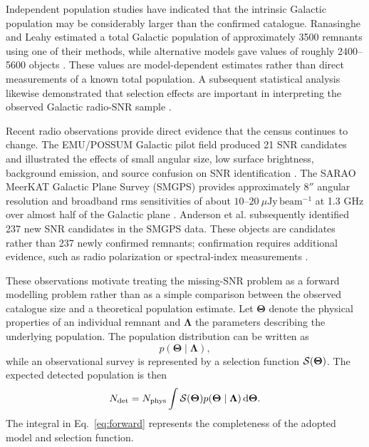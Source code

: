 \documentclass[
aps,
prd,
reprint,
superscriptaddress,
nofootinbib
]{revtex4-2}
\newcommand{\dd}{\mathrm{d}}
\begin{document}
	Independent population studies have indicated that the intrinsic Galactic
	population may be considerably larger than the confirmed catalogue.
	Ranasinghe and Leahy estimated a total Galactic population of approximately
	3500 remnants using one of their methods, while alternative models gave values
	of roughly 2400--5600 objects \cite{RanasingheLeahy2022}.  These values are
	model-dependent estimates rather than direct measurements of a known total
	population.  A subsequent statistical analysis likewise demonstrated that
	selection effects are important in interpreting the observed Galactic
	radio-SNR sample \cite{RanasingheLeahy2023}.
	
	Recent radio observations provide direct evidence that the census continues to
	change.  The EMU/POSSUM Galactic pilot field produced 21 SNR candidates and
	illustrated the effects of small angular size, low surface brightness,
	background emission, and source confusion on SNR identification
	\cite{Duchesne2023}.  The SARAO MeerKAT Galactic Plane Survey (SMGPS) provides
	approximately $8''$ angular resolution and broadband rms sensitivities of
	about $10$--$20~\mu\mathrm{Jy\,beam^{-1}}$ at 1.3 GHz over almost half of the
	Galactic plane \cite{Goedhart2024}.  Anderson et al. subsequently identified
	237 new SNR candidates in the SMGPS data.  These objects are candidates rather
	than 237 newly confirmed remnants; confirmation requires additional evidence,
	such as radio polarization or spectral-index measurements
	\cite{Anderson2025}.
	
	These observations motivate treating the missing-SNR problem as a forward
	modelling problem rather than as a simple comparison between the observed
	catalogue size and a theoretical population estimate.  Let
	$\bm{\Theta}$ denote the physical properties of an individual remnant and
	$\bm{\Lambda}$ the parameters describing the underlying population.  The
	population distribution can be written as
	\begin{equation}
		p(\bm{\Theta}\mid\bm{\Lambda}),
	\end{equation}
	while an observational survey is represented by a selection function
	${\cal S}(\bm{\Theta})$.  The expected detected population is then
	\begin{equation}
		N_{\rm det}
		=
		N_{\rm phys}
		\int
		{\cal S}(\bm{\Theta})
		p(\bm{\Theta}\mid\bm{\Lambda})
		\,\dd\bm{\Theta}.
		\label{eq:forward}
	\end{equation}
	The integral in Eq.~\eqref{eq:forward} represents the completeness of the
	adopted model and selection function.
	
\end{document}
